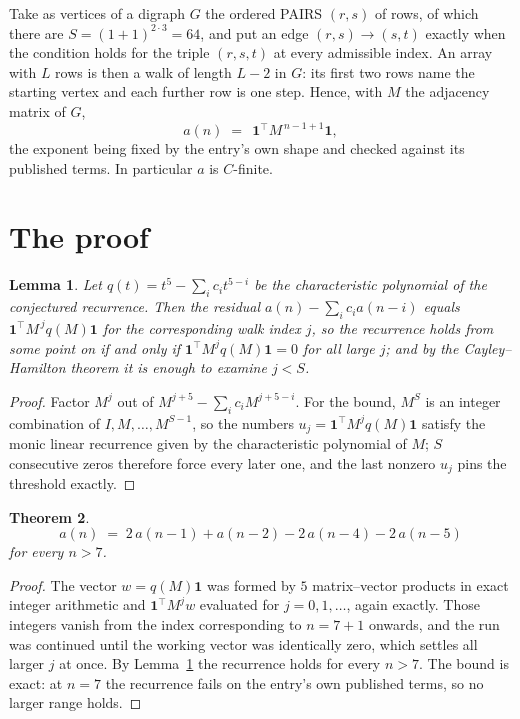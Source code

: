 \documentclass[11pt,a4paper]{article}
\theoremstyle{plain}
\newtheorem{theorem}{Theorem}
\newtheorem{lemma}[theorem]{Lemma}
\theoremstyle{definition}
\begin{document}
Take as vertices of a digraph $G$ the ordered PAIRS $(r,s)$ of rows, of which there are
$S=(1+1)^{2\cdot3}=64$, and put an edge $(r,s)\to(s,t)$ exactly when the condition
holds for the triple $(r,s,t)$ at every admissible index. An array with $L$ rows is then a
walk of length $L-2$ in $G$: its first two rows name the starting vertex and each further
row is one step. Hence, with $M$ the adjacency matrix of $G$,
\[
a(n)\;=\;\,\mathbf{1}^{\!\top}M^{\,n-1+1}\mathbf{1},
\]
the exponent being fixed by the entry's own shape and checked against its published terms.
In particular $a$ is $C$-finite.

\section{The proof}

\begin{lemma}\label{lem:crit}
Let $q(t)=t^{5}-\sum_i c_it^{5-i}$ be the characteristic polynomial of the
conjectured recurrence. Then the residual $a(n)-\sum_ic_ia(n-i)$ equals
$\mathbf{1}^{\!\top}M^{\,j}q(M)\mathbf{1}$ for the corresponding walk index
$j$, so the recurrence holds from some point on if and only if
$\mathbf{1}^{\!\top}M^{j}q(M)\mathbf{1}=0$ for all large $j$; and by the
Cayley--Hamilton theorem it is enough to examine $j<S$.
\end{lemma}

\begin{proof}
Factor $M^{j}$ out of $M^{j+5}-\sum_ic_iM^{j+5-i}$. For the bound, $M^{S}$
is an integer combination of $I,M,\dots,M^{S-1}$, so the numbers
$u_j=\mathbf{1}^{\!\top}M^{j}q(M)\mathbf{1}$ satisfy the monic linear recurrence given by
the characteristic polynomial of $M$; $S$ consecutive zeros therefore force every later one,
and the last nonzero $u_j$ pins the threshold exactly.
\end{proof}

\begin{theorem}
\[
a(n)\;=\;2\,a(n-1) + a(n-2) - 2\,a(n-4) - 2\,a(n-5)
\]
for every $n>7$.
\end{theorem}

\begin{proof}
The vector $w=q(M)\mathbf{1}$ was formed by $5$ matrix--vector products in exact
integer arithmetic and $\mathbf{1}^{\!\top}M^{j}w$ evaluated for $j=0,1,\dots$, again
exactly. Those integers vanish from the index corresponding to $n=7+1$ onwards, and the
run was continued until the working vector was identically zero, which settles all larger $j$
at once. By Lemma~\ref{lem:crit} the recurrence holds for every $n>7$. The bound is exact: at $n=7$ the recurrence fails on the entry's own published terms, so no larger range holds.
\end{proof}
\end{document}
